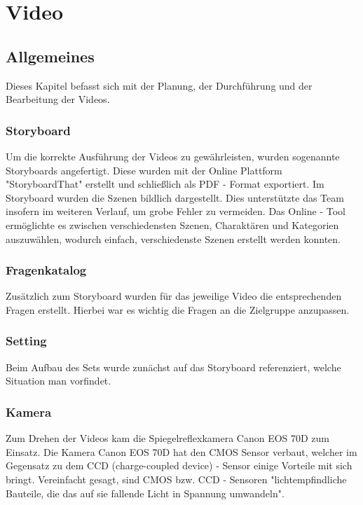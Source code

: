 \chapter{Video}
\section{Allgemeines}
\renewcommand{\kapitelautor}{Autor: Kerstin Schön}
Dieses Kapitel befasst sich mit der Planung, der Durchführung und der Bearbeitung der Videos. 

\subsection{Storyboard}
\renewcommand{\kapitelautor}{Autor: Kerstin Schön}
Um die korrekte Ausführung der Videos zu gewährleisten, wurden sogenannte Storyboards angefertigt. Diese wurden mit der Online Plattform "StoryboardThat" erstellt und schließlich als PDF - Format exportiert.
Im Storyboard wurden die Szenen bildlich dargestellt. Dies unterstützte das Team insofern im weiteren Verlauf, um grobe Fehler zu vermeiden.
Das Online - Tool ermöglichte es zwischen verschiedensten Szenen, Charaktären und Kategorien auszuwählen, wodurch einfach, verschiedenste Szenen erstellt werden konnten.
 
\subsection{Fragenkatalog}
\renewcommand{\kapitelautor}{Autor: Kerstin Schön}
Zusätzlich zum Storyboard wurden für das jeweilige Video die entsprechenden Fragen erstellt. Hierbei war es wichtig die Fragen an die Zielgruppe anzupassen. 

\subsection{Setting}
Beim Aufbau des Sets wurde zunächst auf das Storyboard referenziert, welche Situation man vorfindet. 

\subsection{Kamera}
Zum Drehen der Videos kam die Spiegelreflexkamera Canon EOS 70D zum Einsatz. Die Kamera Canon EOS 70D hat den CMOS Sensor verbaut, welcher im Gegensatz zu dem CCD (charge-coupled device) - Sensor einige Vorteile mit sich bringt. Vereinfacht gesagt, sind CMOS bzw. CCD - Sensoren "lichtempfindliche Bauteile, die das auf sie fallende Licht in Spannung umwandeln".  

